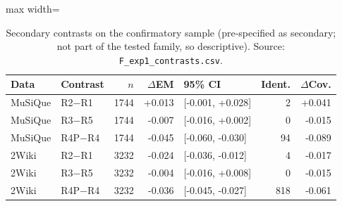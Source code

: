 \begin{table}[t]
\centering
\small
\begin{adjustbox}{max width=\linewidth}
\begin{tabular}{@{}llrrlrr@{}}
\toprule
Data & Contrast & $n$ & $\Delta$EM & 95\% CI & Ident. & $\Delta$Cov. \\
\midrule
MuSiQue & R2$-$R1 & 1744 & +0.013 & [-0.001, +0.028] & 2 & +0.041 \\
MuSiQue & R3$-$R5 & 1744 & -0.007 & [-0.016, +0.002] & 0 & -0.015 \\
MuSiQue & R4P$-$R4 & 1744 & -0.045 & [-0.060, -0.030] & 94 & -0.089 \\
2Wiki & R2$-$R1 & 3232 & -0.024 & [-0.036, -0.012] & 4 & -0.017 \\
2Wiki & R3$-$R5 & 3232 & -0.004 & [-0.016, +0.008] & 0 & -0.015 \\
2Wiki & R4P$-$R4 & 3232 & -0.036 & [-0.045, -0.027] & 818 & -0.061 \\
\bottomrule
\end{tabular}
\end{adjustbox}
\caption{Secondary contrasts on the confirmatory sample (pre-specified as secondary; not part of the tested family, so descriptive). Source: \texttt{F\_exp1\_contrasts.csv}.}
\label{tab:confirm-secondary}
\end{table}
